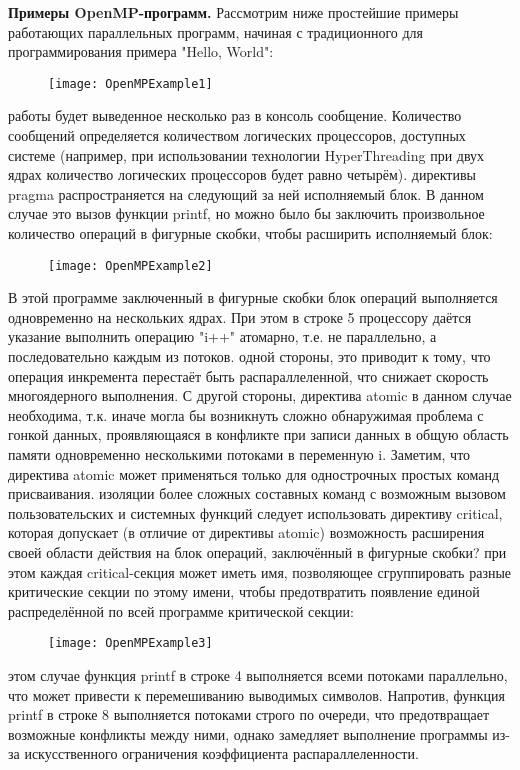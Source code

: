 {	\par\textbf{Примеры OpenMP-программ.} Рассмотрим ниже простейшие примеры работающих параллельных программ, начиная с традиционного для программирования примера "Hello, World":
	\begin{figure}[H]
		\texttt{[image: OpenMPExample1]}
	\end{figure}
	 работы будет выведенное несколько раз в консоль сообщение. Количество сообщений определяется количеством логических процессоров, доступных системе (например, при использовании технологии HyperThreading при двух ядрах количество логических процессоров будет равно четырём). 
	 директивы pragma распространяется на следующий за ней исполняемый блок. В данном случае это вызов функции printf, но можно было бы заключить произвольное количество операций в фигурные скобки, чтобы расширить исполняемый блок:
	\begin{figure}[H]
		\texttt{[image: OpenMPExample2]}
	\end{figure}
	В этой программе заключенный в фигурные скобки блок операций выполняется одновременно на нескольких ядрах. При этом в строке 5 процессору даётся указание выполнить операцию "i++" атомарно, т.е. не параллельно, а последовательно каждым из потоков. 
	 одной стороны, это приводит к тому, что операция инкремента перестаёт быть распараллеленной, что снижает скорость многоядерного выполнения. С другой стороны, директива atomic в данном случае необходима, т.к. иначе могла бы возникнуть сложно обнаружимая проблема с гонкой данных, проявляющаяся в конфликте при записи данных в общую область памяти одновременно несколькими потоками в переменную i. Заметим, что директива atomic может применяться только для однострочных простых команд присваивания. 
	 изоляции более сложных составных команд с возможным вызовом пользовательских и системных функций следует использовать директиву critical, которая допускает (в отличие от директивы atomic) возможность расширения своей области действия на блок операций, заключённый в фигурные скобки? при этом каждая critical-секция может иметь имя, позволяющее сгруппировать разные критические секции по этому имени, чтобы предотвратить появление единой распределённой по всей программе критической секции:
	\begin{figure}[H]
		\texttt{[image: OpenMPExample3]}
	\end{figure}
	 этом случае функция printf в строке 4 выполняется всеми потоками параллельно, что может привести к перемешиванию выводимых символов. Напротив, функция printf в строке 8 выполняется потоками строго по очереди, что предотвращает возможные конфликты между ними, однако замедляет выполнение программы из-за искусственного ограничения коэффициента распараллеленности.
}
